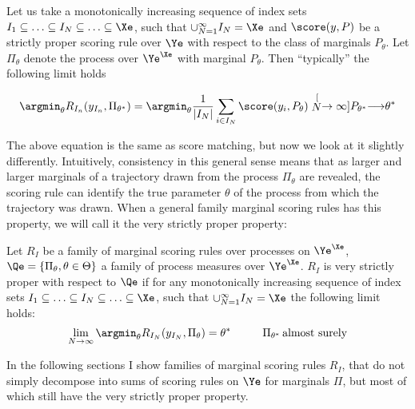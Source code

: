 \begin{statement}
Let us take a monotonically increasing sequence of index sets $I_1\subseteq\ldots\subseteq I_N \subseteq \ldots \subseteq \Xe$, such that $\cup_{N=1}^{\infty} I_N = \Xe$ and $\score(y,P)$ be a strictly proper scoring rule over $\Ye$ with respect to the class of marginals $P_{\theta}$. Let $\Pi_{\theta}$ denote the \iid process over $\Ye^{\Xe}$ with marginal $P_{\theta}$. Then ``typically'' the following limit holds

\begin{align}
\argmin_{\theta}R_{I_n}(y_{I_n},\Pi_{\theta^{*}}) =  \argmin_{\theta} \frac{1}{\vert I_N \vert} \sum_{i\in I_N} \score(y	_i,P_{\theta}) \stackrel[N\rightarrow\infty]{P_{\theta^{*}}}{\longrightarrow} \theta^{*}
\end{align}
\end{statement}

The above equation is the same as score matching, but now we look at it slightly differently. Intuitively, consistency in this general sense means that as larger and larger marginals of a trajectory drawn from the process $\Pi_{\theta}$ are revealed, the scoring rule can identify the true parameter $\theta$ of the process from which the trajectory was drawn. When a general family marginal scoring rules has this property, we will call it the very strictly proper property:

\begin{definition}\label{thm:very_strictly_proper}
Let $R_{I}$ be a family of marginal scoring rules over processes on $\Ye^{\Xe}$, $\Qe = \{\Pi_\theta, \theta\in\Theta\}$ a family of process measures over $\Ye^{\Xe}$. $R_{I}$ is very strictly proper with respect to $\Qe$ if for any monotonically increasing sequence of index sets $I_1\subseteq\ldots\subseteq I_N \subseteq \ldots \subseteq \Xe$, such that $\cup_{N=1}^{\infty} I_N = \Xe$ the following limit holds:
\begin{align}
\lim_{N\rightarrow\infty} \argmin_{\theta} R_{I_N}(y_{I_N},\Pi_{\theta}) = \theta^{*}\hspace{1cm}\Pi_{\theta^{*}}\mbox{\,almost surely}
\end{align}
\end{definition}

In the following sections I show families of marginal scoring rules $R_I$, that do not simply decompose into sums of scoring rules on $\Ye$ for marginals $\Pi$, but most of which still have the very strictly proper property.


